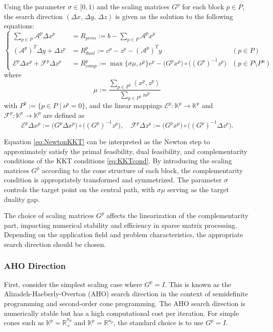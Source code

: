 Using the parameter $\sigma \in [0,1)$ and the scaling matrices $G^p$ for each block $p \in P$, the search direction $(\Delta x,\, \Delta y,\, \Delta z)$ is given as the solution to the following equations:
\begin{equation}
    \renewcommand{\arraystretch}{2.5}
    \left\{
    \begin{array}{rll}
         \sum_{p \in P} \mathcal{A}^p \Delta x^p & = R_{prim} := b - \sum_{p \in P} \mathcal{A}^p x^p &  \\
         (\mathcal{A}^p)^T \Delta y + \Delta z^p & = R_{dual}^p := c^p - z^p - (\mathcal{A}^p)^T y & (p \in P) \\
         \mathcal{E}^p \Delta x^p + \mathcal{F}^p \Delta z^p & = R_{comp}^p := \max\{\sigma \mu, \nu^p\} e^p - \big(G^p x^p\big) \circ \big((G^p)^{-1} z^p\big) & (p \in P \setminus P^{\text{u}})
    \end{array}
    \right.
    \label{eq:NewtonKKT}
\end{equation}
where 
\begin{equation}
  \mu := \frac{\sum_{p \in P^0} \left\langle x^p, z^p \right\rangle}
              {\sum_{p \in P^0} n^p}
  \label{eq:mu}
\end{equation}
with $P^0 := \{p\in P \mid \nu^p=0\}$, and the linear mappings $\mathcal{E}^p : \mathbb{K}^p \to \mathbb{K}^p$ and $\mathcal{F}^p : \mathbb{K}^p \to \mathbb{K}^p$ are defined as
\[
  \mathcal{E}^p \Delta x^p
    := \big(G^p \Delta x^p\big) \circ \big((G^p)^{-1} z^p\big),
  \quad
  \mathcal{F}^p \Delta z^p
    := \big(G^p x^p\big) \circ \big((G^p)^{-1} \Delta z^p\big).
\]

Equation \eqref{eq:NewtonKKT} can be interpreted as the Newton step to approximately satisfy the primal feasibility, dual feasibility, and complementarity conditions of the KKT conditions \eqref{eq:KKTcond}.
By introducing the scaling matrices $G^p$ according to the cone structure of each block, the complementarity condition is appropriately transformed and symmetrized.
The parameter $\sigma$ controls the target point on the central path, with $\sigma \mu$ serving as the target duality gap.

The choice of scaling matrices $G^p$ affects the linearization of the complementarity part, impacting numerical stability and efficiency in sparse matrix processing.
Depending on the application field and problem characteristics, the appropriate search direction should be chosen.


\subsubsection{AHO Direction}
First, consider the simplest scaling case where $G^p = I$. 
This is known as the Alizadeh-Haeberly-Overton (AHO) search direction \cite{Alizadeh1998} in the context of semidefinite programming and second-order cone programming. 
The AHO search direction is numerically stable but has a high computational cost per iteration. 
For simple cones such as $\mathbb{K}^p = \mathbb{R}^{n_p}_+$ and $\mathbb{K}^p = \mathbb{R}^{n_p}$, the standard choice is to use $G^p = I$.


